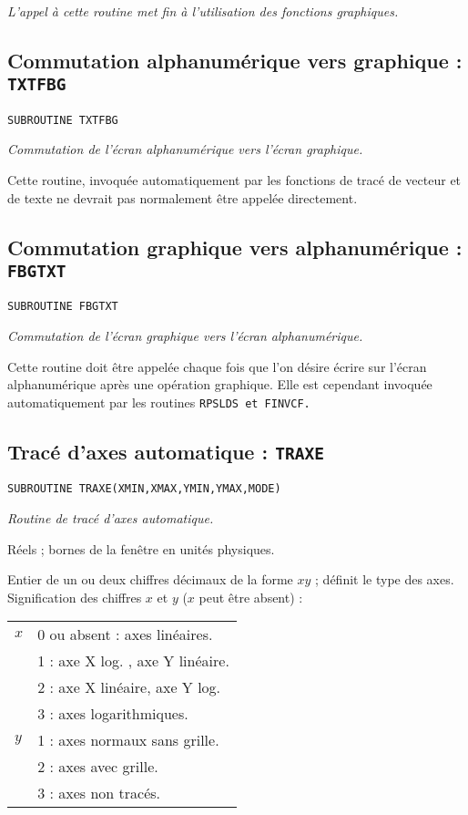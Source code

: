 \documentclass[a4paper,12pt,titlepage]{article}
\newcommand{\darg}[1]{\item[\tt #1\rm]}
\newcommand{\fsub}[1]{\hbox {\tt SUBROUTINE #1  } \medskip }
\newenvironment{argdesc}{\begin{list}{-}{\leftmargin 8em \labelwidth 7em}}%
{\end{list}}
\begin{document}
    \em L'appel \`a cette routine met fin \`a l'utilisation des fonctions
    graphiques.\em

\subsection{Commutation alphanum\'erique vers graphique : \tt TXTFBG}
\fsub{TXTFBG}

   \em Commutation de l'\'ecran alphanum\'erique vers l'\'ecran graphique.\em

   Cette routine, invoqu\'ee automatiquement par les fonctions de trac\'e de
vecteur et de texte ne devrait pas normalement \^etre appel\'ee directement.

\subsection{Commutation graphique vers alphanum\'erique : \tt FBGTXT}
\fsub{FBGTXT}

   \em Commutation de l'\'ecran graphique vers l'\'ecran alphanum\'erique.\em

   Cette routine doit \^etre appel\'ee chaque fois que l'on d\'esire
\'ecrire sur l'\'ecran alphanum\'erique apr\`es une op\'eration graphique.
Elle est cependant invoqu\'ee automatiquement par les routines \tt RPSLDS\rm\
et \tt FINVCF\rm. 

\subsection{Trac\'e d'axes automatique : \tt TRAXE}
\fsub{TRAXE(XMIN,XMAX,YMIN,YMAX,MODE)}

    \em Routine de trac\'e d'axes automatique.\em

\begin{argdesc}
    \darg{XMIN,XMAX,YMIN,YMAX  :}
              R\'eels ;  bornes de la fen\^etre en unit\'es physiques.
    \darg{MODE  :}      Entier  de un ou deux chiffres d\'ecimaux de la  forme 
              $xy$ ;   d\'efinit  le type des  axes.  Signification  des 
              chiffres $x$ et $y$ ($x$ peut \^etre absent) : 

              \begin{center}\begin{tabular}{ll}
            $x$  &  0 ou absent  :  axes lin\'eaires.\\
                 &  1  :  axe X log.    , axe Y lin\'eaire.\\
                 &  2  :  axe X lin\'eaire, axe Y log.\\
                 &  3  :  axes logarithmiques.\\
            $y$  &  1  :  axes normaux sans grille.\\
                 &  2  :  axes avec grille.\\
                 &  3  :  axes non trac\'es.\\
              \end{tabular}\end{center}
\end{argdesc}
\end{document}
